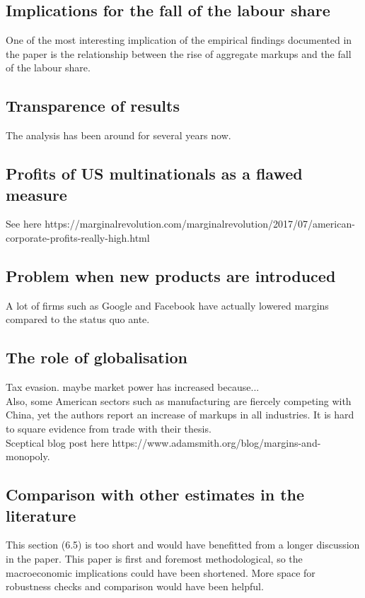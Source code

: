 \documentclass{amsart}
\theoremstyle{definition}
\theoremstyle{remark}
\numberwithin{equation}{section}
\begin{document}
\subsection*{Implications for the fall of the labour share} One of the most interesting implication of the empirical findings documented in the paper is the relationship between the rise of aggregate markups and the fall of the labour share.\\

\subsection{Transparence of results} The analysis has been around for several years now.

\subsection*{Profits of US multinationals as a flawed measure} See here https://marginalrevolution.com/marginalrevolution/2017/07/american-corporate-profits-really-high.html

\subsection*{Problem when new products are introduced} A lot of firms such as Google and Facebook have actually lowered margins compared to the status quo ante.

\subsection*{The role of globalisation} Tax evasion. maybe market power has increased because...\\
Also, some American sectors such as manufacturing are fiercely competing with China, yet the authors report an increase of markups in all industries. It is hard to square evidence from trade with their thesis.\\

Sceptical blog post here https://www.adamsmith.org/blog/margins-and-monopoly.

\subsection*{Comparison with other estimates in the literature} This section (6.5) is too short and would have benefitted from a longer discussion in the paper. This paper is first and foremost methodological, so the macroeconomic implications could have been shortened. More space for robustness checks and comparison would have been helpful.\\
\end{document}
